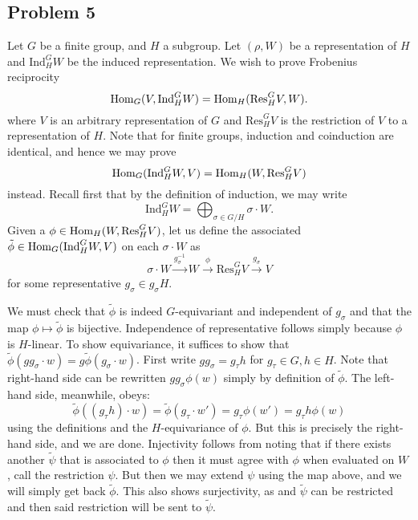 \documentclass{../../mathnotes}
\begin{document}
\subsection*{Problem 5}

Let $G$ be a finite group, and $H$ a subgroup. Let $(\rho, W)$ be a representation of $H$ and $\text{Ind}_H^G W$ be the induced representation.
We wish to prove Frobenius reciprocity
\[\operatorname{Hom}_G(V,\text{Ind}_H^G W)=\operatorname{Hom}_H(\text{Res}_H^G V,W).\]
where $V$ is an arbitrary representation of $G$ and $\text{Res}_H^G V$ is the restriction of $V$ to a representation of $H$.
Note that for finite groups, induction and coinduction are identical, and hence we may prove
\[\operatorname{Hom}_G(\text{Ind}_H^G W,V)=\operatorname{Hom}_H(W,\text{Res}_H^G V)\]
instead. Recall first that by the definition of induction, we may write
\[\text{Ind}_H^GW=\bigoplus_{\sigma\in G/H}\sigma\cdot W.\]
Given a $\phi\in\operatorname{Hom}_H(W,\text{Res}_H^G V)$, let us define the associated $\tilde \phi\in\operatorname{Hom}_G(\text{Ind}_H^G W,V)$ on each $\sigma\cdot W$ as
\[\sigma\cdot W\overset{g_\sigma^{-1}}{\longrightarrow} W\overset{\phi}{\longrightarrow} \text{Res}_H^GV\overset{g_\sigma}{\longrightarrow} V\]
for some representative $g_\sigma\in g_\sigma H$.

We must check that $\tilde \phi$ is indeed $G$-equivariant and independent of $g_\sigma$ and that the map $\phi\mapsto\tilde\phi$ is bijective.
Independence of representative follows simply because $\phi$ is $H$-linear.
To show equivariance, it suffices to show that $\tilde\phi(gg_\sigma\cdot w)=g\tilde\phi(g_\sigma\cdot w)$. First write $gg_\sigma=g_\tau h$ for $g_\tau\in G,h\in H$.
Note that right-hand side can be rewritten $gg_\sigma\phi(w)$ simply by definition of $\tilde\phi$. The left-hand side, meanwhile, obeys:
\[\tilde\phi\left( (g_\tau h)\cdot w \right)=\tilde\phi(g_\tau\cdot w')=g_\tau\phi(w')=g_\tau h\phi(w)\]
using the definitions and the $H$-equivariance of $\phi$. But this is precisely the right-hand side, and we are done.
Injectivity follows from noting that if there exists another $\tilde \psi$ that is associated to $\phi$ then it must agree with $\phi$ when evaluated on
$W$, call the restriction $\psi$. But then we may extend $\psi$ using the map above, and we will simply get back $\tilde\phi$.
This also shows surjectivity,
as and $\tilde\psi$ can be restricted and then said restriction will be sent to $\tilde\psi$.
\end{document}
